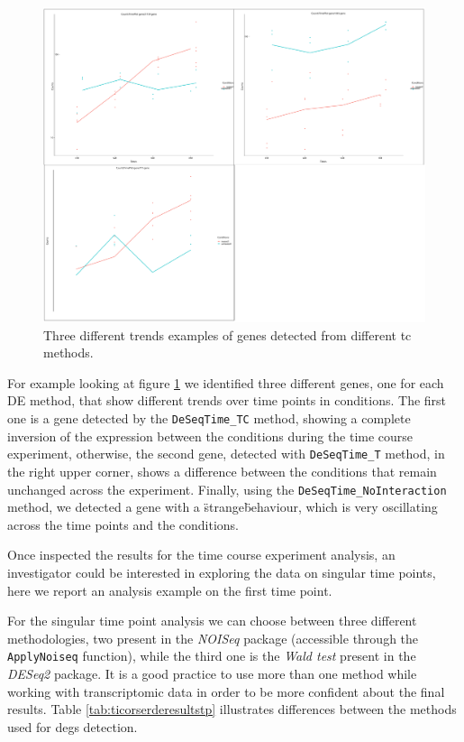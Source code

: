 \begin{figure}[H]
\includegraphics[width=\textwidth,keepaspectratio]{img/ticorser/de/trends/trends.pdf}
\caption[ticorser genes trends]{Three different trends examples of genes detected from different \gls{tc} methods.}
\label{fig:ticorsertrends}
\centering
\end{figure}

For example looking at figure \ref{fig:ticorsertrends} we identified three different genes, one for each DE method, that show different trends over time points in conditions.
The first one is a gene detected by the \lstinline!DeSeqTime_TC! method, showing a complete inversion of the expression between the conditions during the time course experiment, otherwise, the second gene, detected with \lstinline!DeSeqTime_T! method, in the right upper corner, shows a difference between the conditions that remain unchanged across the experiment.
Finally, using the \lstinline!DeSeqTime_NoInteraction! method, we detected a gene with a \"strange\" behaviour, which is very oscillating across the time points and the conditions. 

Once inspected the results for the time course experiment analysis, an investigator could be interested in exploring the data on singular time points, here we report an analysis example on the first time point.

For the singular time point analysis we can choose between three different methodologies, two present in the \textit{NOISeq} package (accessible through the \lstinline!ApplyNoiseq! function), while the third one is the \textit{Wald test} present in the \textit{DESeq2} package.
It is a good practice to use more than one method while working with transcriptomic data in order to be more confident about the final results.
Table \ref{tab:ticorserderesultstp} illustrates differences between the methods used for \glspl{deg} detection.


